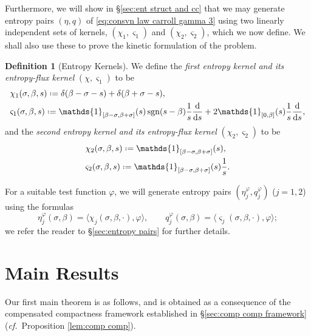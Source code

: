 \documentclass[11pt,a4paper,reqno]{amsart}
\numberwithin{equation}{section}
\theoremstyle{definition}
\newtheorem{definition}[lemma]{Definition}
\theoremstyle{remark}
\newcommand{\der}{\mathrm{d}}
\newcommand*{\defeq}{\mathrel{\vcenter{\baselineskip0.5ex \lineskiplimit0pt
                     \hbox{\scriptsize.}\hbox{\scriptsize.}}}%
                     =}
\DeclareMathOperator\sgn{sgn}
\begin{document}
{Furthermore, we will show in \S \ref{sec:ent struct and cc} that we may generate entropy pairs $(\eta,q)$ of \eqref{eq:consvn law carroll gamma 3} using two linearly independent sets of kernels, $(\chi_1,\varsigma_1)$ and $(\chi_2,\varsigma_2)$, which we now define. We shall also use these to prove the kinetic formulation of the problem. 
\begin{definition}[Entropy Kernels]\label{def:entropy kernels}
  We define the \emph{first entropy kernel and its entropy-flux kernel} $(\chi,\varsigma_1)$ to be 
  \begin{equation}\label{eq:kernel 1}
    \begin{aligned}
    &\chi_1(\sigma,\beta,s) \defeq \delta(\beta-\sigma-s) + \delta(\beta+\sigma-s), \\ 
    &\varsigma_1(\sigma,\beta,s) \defeq \mathds{1}_{[\beta-\sigma,\beta+\sigma]}(s) \sgn(s-\beta)\frac{1}{s} \frac{\der}{\der s} + 2 \mathds{1}_{[0,\beta]}(s) \frac{1}{s} \frac{\der}{\der s}, 
    \end{aligned}
\end{equation}
and the \emph{second entropy kernel and its entropy-flux kernel} $(\chi_2,\varsigma_2)$ to be 
  \begin{equation}\label{eq:kernel 2}
    \begin{aligned}
     &\chi_2(\sigma,\beta,s) \defeq \mathds{1}_{[\beta-\sigma,\beta+\sigma]}(s), \\ & \varsigma_2(\sigma,\beta,s) \defeq \mathds{1}_{[\beta-\sigma,\beta+\sigma]}(s)\frac{1}{s}. 
    \end{aligned}
\end{equation}
\end{definition}
For a suitable test function $\varphi$, we will generate entropy pairs $(\eta_j^\varphi,q_j^\varphi)$ ($j=1,2$) using the formulas 
\begin{equation}\label{eq:generate my entropies}
    \eta_j^\varphi(\sigma,\beta) = \langle \chi_j(\sigma,\beta,\cdot), \varphi \rangle, \qquad q_j^\varphi(\sigma,\beta) = \langle \varsigma_j(\sigma,\beta,\cdot) , \varphi \rangle; 
\end{equation}
we refer the reader to \S \ref{sec:entropy pairs} for further details.

\section{Main Results} \label{sec:main_results}


Our first main theorem is as follows, and is obtained as a consequence of the compensated compactness framework established in \S \ref{sec:comp comp framework} (\textit{cf.}~Proposition \ref{lem:comp comp}).

}
\end{document}
